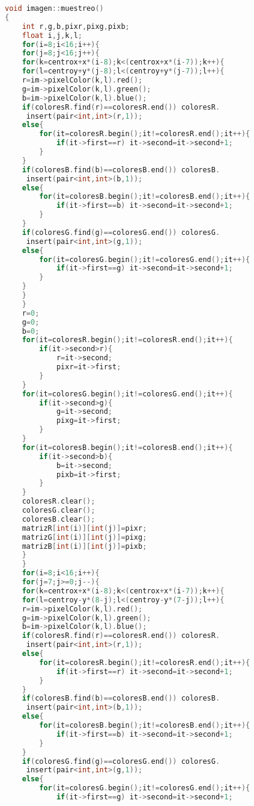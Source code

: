 \documentclass{article}
\begin{document}
\begin{lstlisting}[language=C++, label=Muestreo]
void imagen::muestreo()
{
    int r,g,b,pixr,pixg,pixb;
    float i,j,k,l;
    for(i=8;i<16;i++){
    for(j=8;j<16;j++){
    for(k=centrox+x*(i-8);k<(centrox+x*(i-7));k++){
    for(l=centroy+y*(j-8);l<(centroy+y*(j-7));l++){
    r=im->pixelColor(k,l).red();
    g=im->pixelColor(k,l).green();
    b=im->pixelColor(k,l).blue();
    if(coloresR.find(r)==coloresR.end()) coloresR.
     insert(pair<int,int>(r,1));
    else{
        for(it=coloresR.begin();it!=coloresR.end();it++){
            if(it->first==r) it->second=it->second+1;
        }
    }
    if(coloresB.find(b)==coloresB.end()) coloresB.
     insert(pair<int,int>(b,1));
    else{
        for(it=coloresB.begin();it!=coloresB.end();it++){
            if(it->first==b) it->second=it->second+1;
        }
    }
    if(coloresG.find(g)==coloresG.end()) coloresG.
     insert(pair<int,int>(g,1));
    else{
        for(it=coloresG.begin();it!=coloresG.end();it++){
            if(it->first==g) it->second=it->second+1;
        }
    }
    }
    }
    r=0;
    g=0;
    b=0;
    for(it=coloresR.begin();it!=coloresR.end();it++){
        if(it->second>r){
            r=it->second;
            pixr=it->first;
        }
    }
    for(it=coloresG.begin();it!=coloresG.end();it++){
        if(it->second>g){
            g=it->second;
            pixg=it->first;
        }
    }
    for(it=coloresB.begin();it!=coloresB.end();it++){
        if(it->second>b){
            b=it->second;
            pixb=it->first;
        }
    }
    coloresR.clear();
    coloresG.clear();
    coloresB.clear();
    matrizR[int(i)][int(j)]=pixr;
    matrizG[int(i)][int(j)]=pixg;
    matrizB[int(i)][int(j)]=pixb;
    }
    }
    for(i=8;i<16;i++){
    for(j=7;j>=0;j--){
    for(k=centrox+x*(i-8);k<(centrox+x*(i-7));k++){
    for(l=centroy-y*(8-j);l<(centroy-y*(7-j));l++){
    r=im->pixelColor(k,l).red();
    g=im->pixelColor(k,l).green();
    b=im->pixelColor(k,l).blue();
    if(coloresR.find(r)==coloresR.end()) coloresR.
     insert(pair<int,int>(r,1));
    else{
        for(it=coloresR.begin();it!=coloresR.end();it++){
            if(it->first==r) it->second=it->second+1;
        }
    }
    if(coloresB.find(b)==coloresB.end()) coloresB.
     insert(pair<int,int>(b,1));
    else{
        for(it=coloresB.begin();it!=coloresB.end();it++){
            if(it->first==b) it->second=it->second+1;
        }
    }
    if(coloresG.find(g)==coloresG.end()) coloresG.
     insert(pair<int,int>(g,1));
    else{
        for(it=coloresG.begin();it!=coloresG.end();it++){
            if(it->first==g) it->second=it->second+1;

\end{lstlisting}
\end{document}
